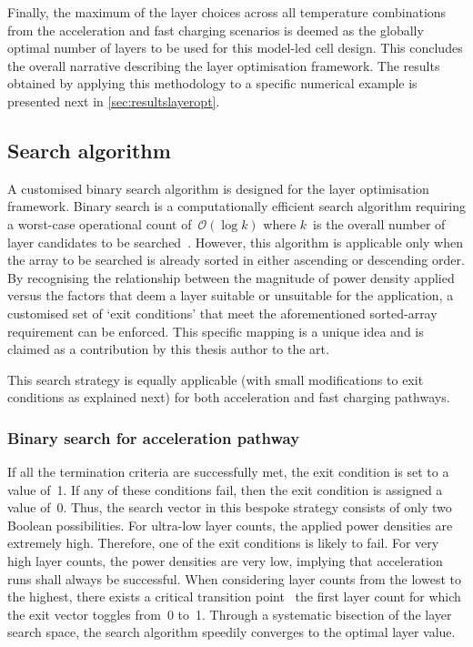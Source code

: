 Finally, the  maximum of the  layer choices across all  temperature combinations
from the  acceleration and  fast charging  scenarios is  deemed as  the globally
optimal  number of  layers  to be  used  for this  model-led  cell design.  This
concludes the overall narrative describing the layer optimisation framework. The
results obtained by applying this methodology to a specific numerical example is
presented next in \cref{sec:resultslayeropt}.


\subsection{Search algorithm}\label{sec:searchalgo}

A  customised binary  search algorithm  is designed  for the  layer optimisation
framework.  Binary  search  is  a  computationally  efficient  search  algorithm
requiring a worst-case  operational count of~$\mathcal{O}(\log k)$  where $k$~is
the  overall  number  of  layer  candidates  to  be  searched~\cite{Cormen2009}.
However, this  algorithm is  applicable only  when the array  to be  searched is
already  sorted in  either ascending  or  descending order.  By recognising  the
relationship between the  magnitude of power density applied  versus the factors
that deem a  layer suitable or unsuitable for the  application, a customised set
of `exit conditions'  that meet the aforementioned  sorted-array requirement can
be  enforced. This  specific  mapping is  a  unique  idea and  is  claimed as  a
contribution by this thesis author to the art.

This search  strategy is  equally applicable (with  small modifications  to exit
conditions as explained next) for both acceleration and fast charging pathways.

\subsubsection*{Binary search for acceleration pathway}

If all the termination criteria are  successfully met, the exit condition is set
to a  value of~1. If any  of these conditions  fail, then the exit  condition is
assigned a value of~0. Thus, the search vector in this bespoke strategy consists
of only two Boolean possibilities. For ultra-low layer counts, the applied power
densities are extremely high. Therefore, one of the exit conditions is likely to
fail. For  very high layer  counts, the power  densities are very  low, implying
that acceleration runs shall always be successful. When considering layer counts
from  the lowest  to  the  highest, there  exists  a  critical transition  point
\viz~the  first layer  count  for which  the exit  vector  toggles from~0  to~1.
Through a systematic  bisection of the layer search space,  the search algorithm
speedily converges to the optimal layer value.

